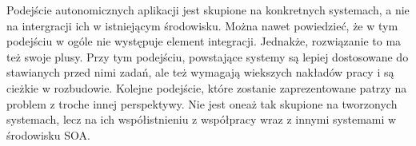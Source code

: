 Podejście autonomicznych aplikacji jest  skupione na konkretnych systemach, a nie na intergracji ich w istniejącym środowisku. Można nawet powiedzieć, że w tym podejściu w ogóle nie występuje element integracji. Jednakże, rozwiązanie to ma też swoje plusy. Przy tym podejściu, powstające systemy są lepiej dostosowane do stawianych przed nimi zadań, ale też wymagają wiekszych nakładów pracy i są cieżkie w rozbudowie. Kolejne podejście, które zostanie zaprezentowane  patrzy na problem z troche innej perspektywy. Nie jest oneaż tak  skupione na tworzonych systemach, lecz na ich współistnieniu z współpracy wraz z innymi systemami w środowisku SOA.






















